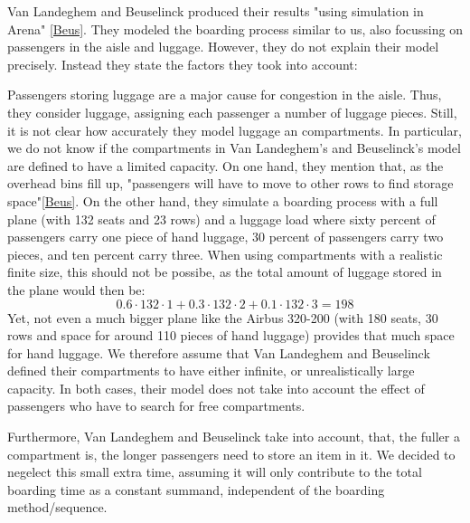 \documentclass[11pt]{article}
\begin{document}
Van Landeghem and Beuselinck produced their results "using simulation in Arena" \ref{Beus}. They modeled the boarding process similar to us, also focussing on passengers in the aisle and luggage. However, they do not explain their model precisely. Instead they state the factors they took into account:


Passengers storing luggage are a major cause for congestion in the aisle. Thus, they consider luggage, assigning each passenger a number of luggage pieces. Still, it is not clear how accurately they model luggage an compartments. In particular, we do not know if the compartments in Van Landeghem's and Beuselinck's model are defined to have a limited capacity. On one hand, they mention that, as the overhead bins fill up, "passengers will have to move to other rows to find storage space"\ref{Beus}. On the other hand, they simulate a boarding process with a full plane (with 132 seats and 23 rows) and a luggage load where sixty percent of passengers carry one piece of hand luggage, 30 percent of passengers carry two pieces, and ten percent carry three. When using compartments with a realistic finite size, this should not be possibe, as the total amount of luggage stored in the plane would then be:
$$ 0.6 \cdot 132 \cdot 1+ 0.3 \cdot 132 \cdot 2 + 0.1 \cdot 132 \cdot 3 = 198$$
Yet, not even a much bigger plane like the Airbus 320-200 (with 180 seats, 30 rows and space for around 110 pieces of hand luggage) provides that much space for hand luggage. We therefore assume that Van Landeghem and Beuselinck defined their compartments to have either infinite, or unrealistically large capacity. In both cases, their model does not take into account the effect of passengers who have to search for free compartments.


Furthermore, Van Landeghem and Beuselinck take into account, that, the fuller a compartment is, the longer passengers need to store an item in it. We decided to negelect this small extra time, assuming it will only contribute to the total boarding time as a constant summand, independent of the boarding method/sequence.
\end{document}
